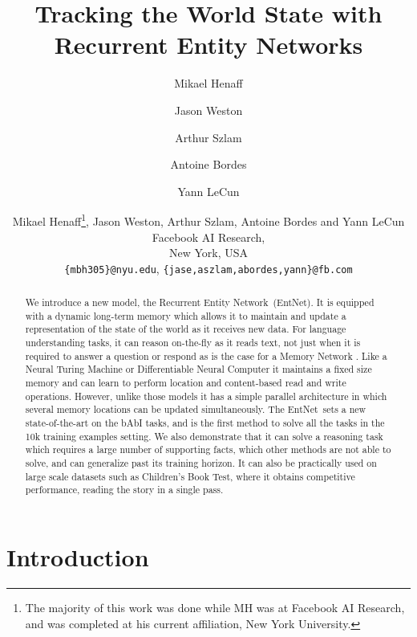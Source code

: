 \documentclass{article} \usepackage{iclr2016_conference,times}
\title{Tracking the World State with \\ Recurrent Entity Networks}
\author[1,2]{Mikael Henaff}
\author[1]{Jason Weston}
\author[1]{Arthur Szlam}
\author[1]{Antoine Bordes}
\author[1,2]{Yann LeCun}
\affil[1]{Facebook AI Research}
\affil[2]{Courant Institute, New York University}
\affil[ ]{\texttt{\{mbh305\}@nyu.edu}, \texttt{\{jase,aszlam,abordes,yann\}@fb.com}}
\author{Mikael Henaff\thanks{The majority of this work was done while MH was at Facebook AI Research, and was completed at his current affiliation, New York University.},
Jason Weston, Arthur Szlam, Antoine Bordes and Yann LeCun \\
Facebook AI Research, \\
New York, USA \\
\texttt{\{mbh305\}@nyu.edu}, \texttt{\{jase,aszlam,abordes,yann\}@fb.com} \\
}
\newcommand{\modelname}{Recurrent Entity Network}
\newcommand{\modelabbrev}{EntNet}
\begin{document}
\makeatletter
{}


\def\maketitle{{\renewenvironment{tabular}[2][]
    {\begin{flushleft}}
    {\end{flushleft}}
  \AB@maketitle}}
\makeatother

\renewcommand\Authands{ and }
\renewcommand\Authfont{\normalfont\normalsize}
\renewcommand\Affilfont{\normalfont\normalsize}

\renewcommand*{\Authfont}{\bfseries}



\maketitle




\begin{abstract}
We introduce a new model, the \modelname~(\modelabbrev). 
It is equipped with a dynamic long-term memory which allows it to maintain and update a representation of the state of the world as it receives new data.
For language understanding tasks, it can reason on-the-fly as it reads text, not
just when it is required to answer a question or respond as is the case for a Memory Network \citep{MemN2N}.
Like a Neural Turing Machine or Differentiable Neural
Computer \citep{NTM, graves2016hybrid} it maintains a fixed size memory and
can learn to perform location and content-based read and write
operations.  However, unlike those models it has a simple parallel 
architecture in which several memory locations can be updated
simultaneously. The \modelabbrev~sets a new state-of-the-art on the bAbI
tasks, and is the first method to solve all the tasks in the 10k
training examples setting.  
We also demonstrate that it can solve a reasoning task which requires a large number of supporting facts, which other methods are not able to solve, and can generalize past its training horizon.
It can also be practically used
on large scale datasets such as 
Children's Book Test, where it obtains competitive performance, reading the story in a single pass.
\end{abstract}

\section{Introduction}
\end{document}
